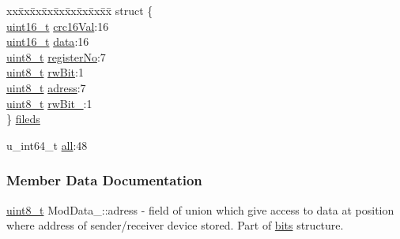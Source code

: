 \begin{DoxyCompactItemize}
\begin{tabbing}
\end{tabbing}\item 
\begin{tabbing}
xx\=xx\=xx\=xx\=xx\=xx\=xx\=xx\=xx\=\kill
struct \{\\
\>\mbox{\hyperlink{settings_8h_a017dd44e68049ffdd31500a8cd01ba68}{uint16\_t}} \mbox{\hyperlink{unionModData___a806e3925e1b4722056cb8f0b46ab9407}{crc16Val}}:16\\
\>\mbox{\hyperlink{settings_8h_a017dd44e68049ffdd31500a8cd01ba68}{uint16\_t}} \mbox{\hyperlink{unionModData___a9da744053275e3ee8e1e8a64e8bed7c3}{data}}:16\\
\>\mbox{\hyperlink{settings_8h_a48091a1e52849b0871df2f7081be2e38}{uint8\_t}} \mbox{\hyperlink{unionModData___acf7fca8058f75c693373e96038158eb8}{registerNo}}:7\\
\>\mbox{\hyperlink{settings_8h_a48091a1e52849b0871df2f7081be2e38}{uint8\_t}} \mbox{\hyperlink{unionModData___ace1455957fe106915d531b3f37c991dd}{rwBit}}:1\\
\>\mbox{\hyperlink{settings_8h_a48091a1e52849b0871df2f7081be2e38}{uint8\_t}} \mbox{\hyperlink{unionModData___afaeee3115b1424db2b572f644ca9d179}{adress}}:7\\
\>\mbox{\hyperlink{settings_8h_a48091a1e52849b0871df2f7081be2e38}{uint8\_t}} \mbox{\hyperlink{unionModData___aaff791ab397b823d20298f3ef7ae37a8}{rwBit\_}}:1\\
\} \mbox{\hyperlink{unionModData___a64b11d6c2878de78325bf04f1e77dcf7}{fileds}}\\

\end{tabbing}\item 
u\+\_\+int64\+\_\+t \mbox{\hyperlink{unionModData___a5d5568437f4a29d0ff4e32bfcd7c5923}{all}}\+:48
\end{DoxyCompactItemize}


\subsubsection{Member Data Documentation}
\mbox{\label{unionModData___afaeee3115b1424db2b572f644ca9d179}} 
{\footnotesize\ttfamily \mbox{\hyperlink{settings_8h_a48091a1e52849b0871df2f7081be2e38}{uint8\+\_\+t}} Mod\+Data\+\_\+\+::\texorpdfstring{adress}{adress}} - field of union which give access to data at position where address of sender/receiver device stored. Part of \hyperlink{unionModData___aa4dd5ccccd7727341bbc1c0027521a66}{bits} structure.

